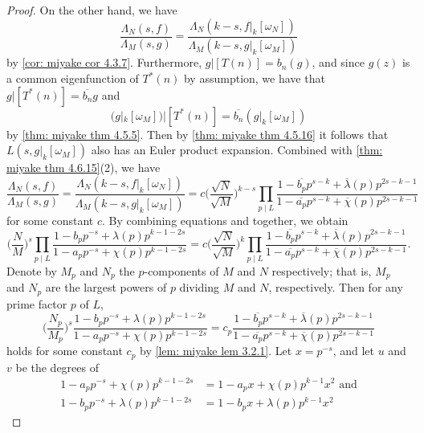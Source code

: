 \documentclass[10pt,leqno,twoside,b5paper]{article}
\theoremstyle{plain}
\theoremstyle{definition}
\numberwithin{equation}{section}
\numberwithin{lem}{section}
\begin{document}
\begin{proof}
    On the other hand, we have
    \[\frac{\varLambda_N(s,f)}{\varLambda_M(s,g)} = \frac{\varLambda_N(k-s,f|_k[\omega_N])}{\varLambda_M(k-s,g|_k[\omega_M])}\] by \cref{cor: miyake cor 4.3.7}. Furthermore, $g|[T(n)] = b_n(g)$, and since $g(z)$ is a common eigenfunction of $T^\ast(n)$ by assumption, we have that $g|[T^\ast(n)] = \overline{b_n}g$ and 
    \[(g|_k[\omega_M])|[T^\ast(n)] = \overline{b_n}(g|_k[\omega_M])\] by \cref{thm: miyake thm 4.5.5}. Then by \cref{thm: miyake thm 4.5.16} it follows that $L(s, g|_k[\omega_M])$ also has an Euler product expansion. Combined with \cref{thm: miyake thm 4.6.15}(2), we have 
    \begin{equation}\label{eqn: ratio shifted varLambdas}
        \frac{\varLambda_N(s,f)}{\varLambda_M(s,g)} = \frac{\varLambda_N(k-s,f|_k[\omega_N])}{\varLambda_M(k-s,g|_k[\omega_M])} = c\bigg(\frac{\sqrt{N}}{\sqrt{M}}\bigg)^{k-s}\prod_{p\mid L}\frac{1-\overline{b_p}p^{s-k} + \overline{\lambda}(p)p^{2s-k-1}}{1-\overline{a_p}p^{s-k} + \overline{\chi}(p)p^{2s-k-1}}
    \end{equation} for some constant $c$. By combining equations  and  together, we obtain
    \[\bigg(\frac{N}{M}\bigg)^s\prod_{p\mid L}\frac{1-b_pp^{-s} + \lambda(p)p^{k-1-2s}}{1-a_pp^{-s} + \chi(p)p^{k-1-2s}} = c\bigg(\frac{\sqrt{N}}{\sqrt{M}}\bigg)^k\prod_{p\mid L}\frac{1-\overline{b_p}p^{s-k} + \overline{\lambda}(p)p^{2s-k-1}}{1-\overline{a_p}p^{s-k} + \overline{\chi}(p)p^{2s-k-1}}.\]
    Denote by $M_p$ and $N_p$ the $p$-components of $M$ and $N$ respectively; that is, $M_p$ and $N_p$ are the largest powers of $p$ dividing $M$ and $N$, respectively. Then for any prime factor $p$ of $L$, 
    \begin{equation}\label{eqn: p-comps}
        \bigg(\frac{N_p}{M_p}\bigg)^s\frac{1-b_pp^{-s} + \lambda(p)p^{k-1-2s}}{1-a_pp^{-s} + \chi(p)p^{k-1-2s}} = c_p
        \frac{1-\overline{b_p}p^{s-k} + \overline{\lambda}(p)p^{2s-k-1}}{1-\overline{a_p}p^{s-k} + \overline{\chi}(p)p^{2s-k-1}}
    \end{equation} holds for some constant $c_p$ by \cref{lem: miyake lem 3.2.1}. Let $x=p^{-s}$, and let $u$ and $v$ be the degrees of
    \begin{align*}
        1-a_pp^{-s} + \chi(p)p^{k-1-2s} &= 1-a_px + \chi(p)p^{k-1}x^2 \text{ and}\\
        1-b_pp^{-s} + \lambda(p)p^{k-1-2s} &= 1-b_px + \lambda(p)p^{k-1}x^2

\end{align*}
\end{proof}
\end{document}

